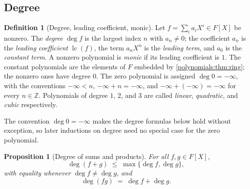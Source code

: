 \documentclass[11pt,a4paper]{article}
\newtheorem{proposition}[theorem]{Proposition}
\theoremstyle{definition}
\newtheorem{definition}[theorem]{Definition}
\theoremstyle{remark}
\newcommand{\Z}{\ensuremath{\mathbb{Z}}}
\begin{document}
\subsection{Degree}\label{polynomials:sub:degree}

\begin{definition}[Degree, leading coefficient, monic]
\label{polynomials:def:degree}
Let \(f = \sum_i a_i X^i \in F[X]\) be nonzero. The \emph{degree}
\(\deg f\) is the largest index \(n\) with \(a_n \neq 0\); the
coefficient \(a_n\) is the \emph{leading coefficient}
\(\operatorname{lc}(f)\), the term \(a_n X^n\) is the \emph{leading
term}, and \(a_0\) is the \emph{constant term}. A nonzero polynomial is
\emph{monic} if its leading coefficient is \(1\). The constant
polynomials are the elements of \(F\) embedded by
\cref{polynomials:thm:ring}; the nonzero ones have degree \(0\). The zero
polynomial is assigned \(\deg 0 = -\infty\), with the conventions
\(-\infty < n\), \(-\infty + n = -\infty\), and
\(-\infty + (-\infty) = -\infty\) for every \(n \in \Z\). Polynomials of
degree \(1\), \(2\), and \(3\) are called \emph{linear},
\emph{quadratic}, and \emph{cubic} respectively.
\end{definition}

The convention \(\deg 0 = -\infty\) makes the degree formulas below hold
without exception, so later inductions on degree need no special case
for the zero polynomial.

\begin{proposition}[Degree of sums and products]\label{polynomials:prop:degree}
For all \(f, g \in F[X]\),
\begin{equation}\label{polynomials:eq:deg-sum}
\deg(f + g) \;\le\; \max\{\deg f, \deg g\},
\end{equation}
with equality whenever \(\deg f \neq \deg g\), and
\begin{equation}\label{polynomials:eq:deg-prod}
\deg(f g) \;=\; \deg f + \deg g .
\end{equation}
\end{proposition}
\end{document}
